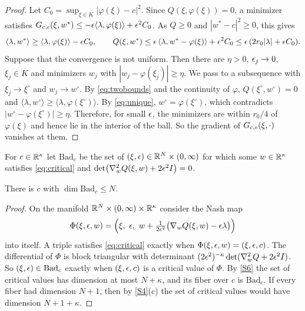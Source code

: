 \begin{proof}
Let $C_0=\sup_{\xi\in K}|\varphi(\xi)-c|^2$. Since $Q(\xi,\varphi(\xi))=0$, a minimizer satisfies $G_{c,\epsilon}(\xi,w^*)\le-\epsilon\langle\lambda,\varphi(\xi)\rangle+\epsilon^2C_0$. As $Q\ge0$ and $|w^*-c|^2\ge0$, this gives
\begin{equation}\label{eq:twobounds}
\langle\lambda,w^*\rangle\ge\langle\lambda,\varphi(\xi)\rangle-\epsilon C_0,\qquad
Q(\xi,w^*)\le\epsilon\,\langle\lambda,w^*-\varphi(\xi)\rangle+\epsilon^2C_0\le\epsilon\,(2r_0|\lambda|+\epsilon C_0).
\end{equation}
Suppose that the convergence is not uniform. Then there are $\eta>0$, $\epsilon_j\to0$, $\xi_j\in K$ and minimizers $w_j$ with $|w_j-\varphi(\xi_j)|\ge\eta$. We pass to a subsequence with $\xi_j\to\xi^\circ$ and $w_j\to w^\circ$. By \eqref{eq:twobounds} and the continuity of $\varphi$, $Q(\xi^\circ,w^\circ)=0$ and $\langle\lambda,w^\circ\rangle\ge\langle\lambda,\varphi(\xi^\circ)\rangle$. By \eqref{eq:unique}, $w^\circ=\varphi(\xi^\circ)$, which contradicts $|w^\circ-\varphi(\xi^\circ)|\ge\eta$. Therefore, for small $\epsilon$, the minimizers are within $r_0/4$ of $\varphi(\xi)$ and hence lie in the interior of the ball. So the gradient of $G_{c,\epsilon}(\xi,\cdot)$ vanishes at them.
\end{proof}

For $c\in\mathbb{R}^\kappa$ let $\mathrm{Bad}_c$ be the set of $(\xi,\epsilon)\in\mathbb{R}^N\times(0,\infty)$ for which some $w\in\mathbb{R}^\kappa$ satisfies \eqref{eq:critical} and $\det\bigl(\nabla_w^2Q(\xi,w)+2\epsilon^2I\bigr)=0$.

\begin{lemma}\label{lem:genericcentre}
There is $c$ with $\dim\mathrm{Bad}_c\le N$.
\end{lemma}

\begin{proof}
On the manifold $\mathbb{R}^N\times(0,\infty)\times\mathbb{R}^\kappa$ consider the Nash map
\[
\Phi(\xi,\eps,w)=\Bigl(\xi,\ \eps,\ w+\tfrac1{2\eps^2}\bigl(\nabla_wQ(\xi,w)-\eps\lambda\bigr)\Bigr)
\]
into itself. A triple satisfies \eqref{eq:critical} exactly when $\Phi(\xi,\epsilon,w)=(\xi,\epsilon,c)$. The differential of $\Phi$ is block triangular with determinant $(2\epsilon^2)^{-\kappa}\det(\nabla_w^2Q+2\epsilon^2I)$. So $(\xi,\epsilon)\in\mathrm{Bad}_c$ exactly when $(\xi,\epsilon,c)$ is a critical value of $\Phi$. By \ref{S6} the set of critical values has dimension at most $N+\kappa$, and its fiber over $c$ is $\mathrm{Bad}_c$. If every fiber had dimension $N+1$, then by \ref{S4}(c) the set of critical values would have dimension $N+1+\kappa$.
\end{proof}

